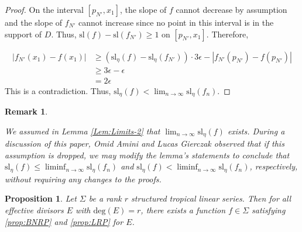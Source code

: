 \documentclass{amsart}
\newtheorem{proposition}[theorem]{Proposition}
\newtheorem{varremark}[theorem]{Remark}
\newenvironment{remark}{\begin{varremark}
		\begin{normalfont}}{\end{normalfont}
\end{varremark}}
\begin{document}
\begin{proof}
		On the interval $[p_{N'}, x_1]$, the slope of $f$ cannot decrease by assumption and the slope of $f_{N'}$ cannot increase since no point in this interval is in the support of $D$. Thus, $\mathrm{sl}(f) - \mathrm{sl}(f_{N'}) \geq 1$ on $[p_{N'},x_1]$. Therefore,
		
		\begin{align*}
			|f_{N'}(x_1) - f(x_1)| & \geq (\mathrm{sl}_{\eta}(f) - \mathrm{sl}_{\eta}(f_{N'})) \cdot 3 \epsilon - |f_{N'}(p_{N'}) - f(p_{N'})| \\
			& \geq 3 \epsilon - \epsilon \\
			& = 2 \epsilon
		\end{align*}
		This is a contradiction. Thus, $\displaystyle \mathrm{sl}_{\eta}(f) < \lim_{n \to \infty} \mathrm{sl}_{\eta}(f_n)$.
	\end{proof}
	
	\begin{remark}
		We assumed in Lemma \ref{Lem:Limits-2} that $\displaystyle \lim_{n \to \infty} \mathrm{sl}_{\eta}(f)$ exists. During a discussion of this paper, Omid Amini and Lucas Gierczak observed that if this assumption is dropped, we may modify the lemma's statements to conclude that $\displaystyle \mathrm{sl}_{\eta}(f) \leq \liminf_{n \to \infty} \mathrm{sl}_{\eta}(f_n)$ and $\displaystyle \mathrm{sl}_{\eta}(f) < \liminf_{n \to \infty} \mathrm{sl}_{\eta}(f_n)$, respectively, without requiring any changes to the proofs.
	\end{remark}
	
	\begin{proposition}
		\label{Prop:Structured-implies-BNRP-and-LRP}
		Let $\Sigma$ be a rank $r$ structured tropical linear series. Then for all effective divisors $E$ with $\mathrm{deg}(E) = r$, there exists a function $f \in \Sigma$ satisfying \ref{prop:BNRP} and \ref{prop:LRP} for $E$.
	\end{proposition}
	
\end{document}
